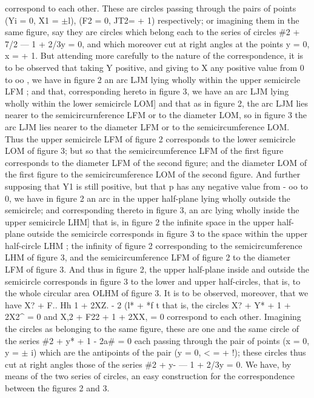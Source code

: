 \documentclass[11pt,a4paper]{book}
\begin{document}
{{{correspond  to  each  other.  These  are  circles  passing  through  the  pairs  of  points
(Yi  =  0,  X1  =  $\pm$l),  (F2  =  0,  JT2=  +  1)  respectively;  or  imagining  them  in  the  same
figure,  say  they  are  circles  which  belong  each  to  the  series  of  circles  \#2  +  7/2  ---  1  +  2/3y  =  0,
and  which  moreover  cut  at  right  angles  at  the  points  y  =  0,  x  =  +  1.  But  attending
more  carefully  to  the  nature  of  the  correspondence,  it  is  to  be  observed  that  taking
Y  positive,  and  giving  to  X  any  positive  value  from  0  to  oo  ,  we  have  in  figure  2
an  arc  LJM  lying  wholly  within  the  upper  semicircle  LFM  ;  and  that,  corresponding
hereto  in  figure  3,  we  have  an  arc  LJM  lying  wholly  within  the  lower  semicircle
LOM]  and  that  as  in  figure  2,  the  arc  LJM  lies  nearer  to  the  semicircurnference
LFM  or  to  the  diameter  LOM,  so  in  figure  3  the  arc  LJM  lies  nearer  to  the
diameter  LFM  or  to  the  semicircumference  LOM.  Thus  the  upper  semicircle  LFM
of  figure  2  corresponds  to  the  lower  semicircle  LOM  of  figure  3;  but  so  that  the
semicircumference  LFM  of  the  first  figure  corresponds  to  the  diameter  LFM  of  the
second  figure;  and  the  diameter  LOM  of  the  first  figure  to  the  semicircumference
LOM  of  the  second  figure.  And  further  supposing  that  Y1  is  still  positive,  but  that
p  has  any  negative  value  from  -  oo  to  0,  we  have  in  figure  2  an  arc  in  the
upper  half-plane  lying  wholly  outside  the  semicircle;  and  corresponding  thereto  in
figure  3,  an  arc  lying  wholly  inside  the  upper  semicircle  LHM]  that  is,  in  figure  2
the  infinite  space  in  the  upper  half-plane  outside  the  semicircle  corresponds  in
figure  3  to  the  space  within  the  upper  half-circle  LHM  ;  the  infinity  of  figure  2
corresponding  to  the  semicircumference  LHM  of  figure  3,  and  the  semicircumference
LFM  of  figure  2  to  the  diameter  LFM  of  figure  3.  And  thus  in  figure  2,  the
upper  half-plane  inside  and  outside  the  semicircle  corresponds  in  figure  3  to  the
lower  and  upper  half-circles,  that  is,  to  the  whole  circular  area  OLHM  of  figure  3.
It  is  to  be  observed,  moreover,  that  we  have
X?  +  F..  Hh  1  +  2XZ.  -  2
(l*  +  *f  t
that  is,  the  circles  X?  +  Y*  +  1  +  2X2^  =  0  and  X,2  +  F22  +  1  +  2XX,  =  0  correspond  to
each  other.  Imagining  the  circles  as  belonging  to  the  same  figure,  these  are  one
and  the  same  circle  of  the  series  \#2  +  y*  +  1  -  2a\#  =  0  each  passing  through  the  pair
of  points  (x  =  0,  y  =  $\pm$  i)  which  are  the  antipoints  of  the  pair  (y  =  0,  < =  +  !);
these  circles  thus  cut  at  right  angles  those  of  the  series  \#2  +  y-  ---  1  +  2/3y  =  0.  We
have,  by  means  of  the  two  series  of  circles,  an  easy  construction  for  the  correspondence
between  the  figures  2  and  3.
}}}
\end{document}
